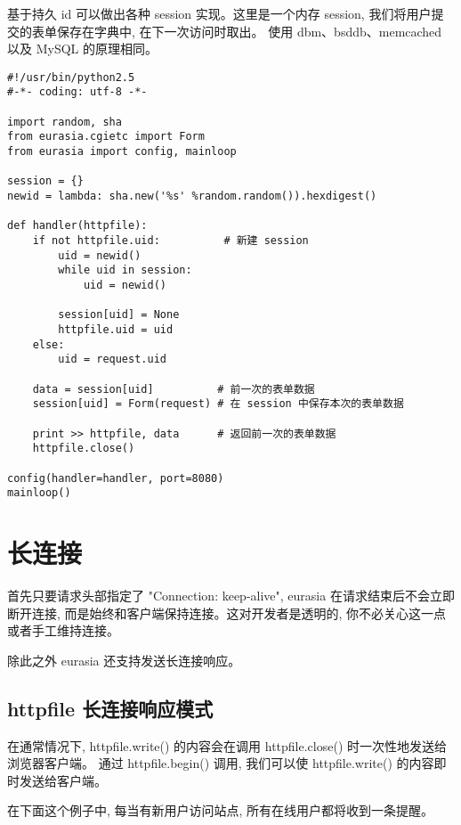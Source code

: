 \documentclass{manual}
\begin{document}
基于持久 id 可以做出各种 session 实现。这里是一个内存 session,
我们将用户提交的表单保存在字典中, 在下一次访问时取出。
使用 dbm、bsddb、memcached 以及 MySQL 的原理相同。

\begin{verbatim}
#!/usr/bin/python2.5
#-*- coding: utf-8 -*-

import random, sha
from eurasia.cgietc import Form
from eurasia import config, mainloop

session = {}
newid = lambda: sha.new('%s' %random.random()).hexdigest()

def handler(httpfile):
	if not httpfile.uid:          # 新建 session
		uid = newid()
		while uid in session:
			uid = newid()

		session[uid] = None
		httpfile.uid = uid
	else:
		uid = request.uid

	data = session[uid]          # 前一次的表单数据
	session[uid] = Form(request) # 在 session 中保存本次的表单数据

	print >> httpfile, data      # 返回前一次的表单数据
	httpfile.close()

config(handler=handler, port=8080)
mainloop()
\end{verbatim}


\section{长连接}

首先只要请求头部指定了 "Connection: keep-alive", eurasia 在请求结束后不会立即断开连接,
而是始终和客户端保持连接。这对开发者是透明的, 你不必关心这一点或者手工维持连接。

除此之外 eurasia 还支持发送长连接响应。

\subsection{httpfile 长连接响应模式}

在通常情况下, httpfile.write() 的内容会在调用 httpfile.close() 时一次性地发送给浏览器客户端。
通过 httpfile.begin() 调用, 我们可以使 httpfile.write() 的内容即时发送给客户端。

在下面这个例子中, 每当有新用户访问站点, 所有在线用户都将收到一条提醒。

\end{document}
